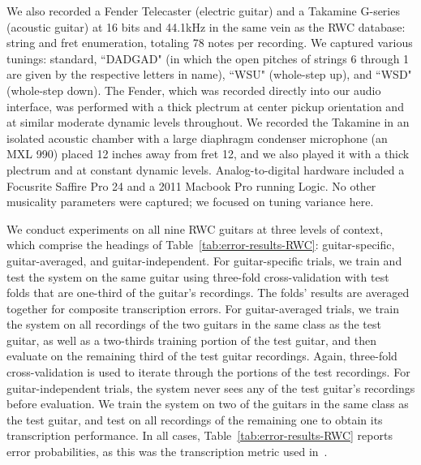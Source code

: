 \documentclass[12pt]{cmuthesis}
\begin{document}
We also recorded a Fender Telecaster (electric guitar) and a Takamine G-series (acoustic guitar) at 16 bits and 44.1kHz in the same vein as the RWC database: string and fret enumeration, totaling 78 notes per recording. We captured various tunings: standard, ``DADGAD" (in which the open pitches of strings 6 through 1 are given by the respective letters in name), ``WSU" (whole-step up), and ``WSD" (whole-step down). The Fender, which was recorded directly into our audio interface, was performed with a thick plectrum at center pickup orientation and at similar moderate dynamic levels throughout. We recorded the Takamine in an isolated acoustic chamber with a large diaphragm condenser microphone (an MXL 990) placed 12 inches away from fret 12, and we also played it with a thick plectrum and at constant dynamic levels. Analog-to-digital hardware included a Focusrite Saffire Pro 24 and a 2011 Macbook Pro running Logic. No other musicality parameters were captured; we focused on tuning variance here.

We conduct experiments on all nine RWC guitars at three levels of context, which comprise the headings of Table~\ref{tab:error-results-RWC}: guitar-specific, guitar-averaged, and guitar-independent. For guitar-specific trials, we train and test the system on the same guitar using three-fold cross-validation with test folds that are one-third of the guitar's recordings. The folds' results are averaged together for composite transcription errors. For guitar-averaged trials, we train the system on all recordings of the two guitars in the same class as the test guitar, as well as a two-thirds training portion of the test guitar, and then evaluate on the remaining third of the test guitar recordings. Again, three-fold cross-validation is used to iterate through the portions of the test recordings. For guitar-independent trials, the system never sees any of the test guitar's recordings before evaluation. We train the system on two of the guitars in the same class as the test guitar, and test on all recordings of the remaining one to obtain its transcription performance. In all cases, Table~\ref{tab:error-results-RWC} reports error probabilities, as this was the transcription metric used in~\cite{barbanchoi2012}.
\end{document}
